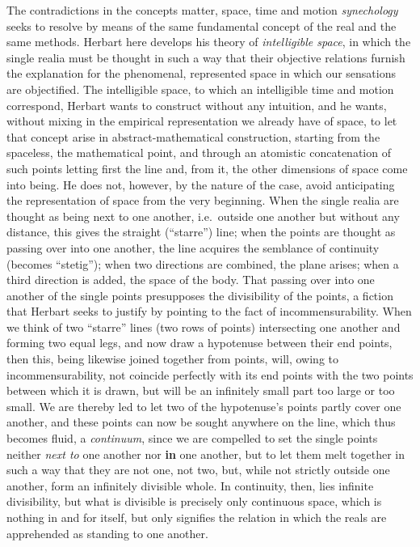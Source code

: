 The contradictions in the concepts matter, space, time and motion
\emph{synechology} seeks to resolve by means of the same fundamental
concept of the real and the same methods. Herbart here develops his
theory of \emph{intelligible space}, in which the single realia must be
thought in such a way that their objective relations furnish the
explanation for the phenomenal, represented space in which our
sensations are objectified. The intelligible space, to which an
intelligible time and motion correspond, Herbart wants to construct
without any intuition, and he wants, without mixing in the empirical
representation we already have of space, to let that concept arise in
abstract-mathematical construction, starting from the spaceless, the
mathematical point, and through an atomistic concatenation of such points
letting first the line and, from it, the other dimensions of space come
into being. He does not, however, by the nature of the case, avoid
anticipating the representation of space from the very beginning. When
the single realia are thought as being next to one another, i.e.\
outside one another but without any distance, this gives the straight
(``starre'') line; when the points are thought as passing over into one
another, the line acquires the semblance of continuity (becomes
``stetig''); when two directions are combined, the plane arises; when a
third direction is added, the space of the body. That passing over into
one another of the single points presupposes the divisibility of the
points, a fiction that Herbart seeks to justify by pointing to the fact
of incommensurability. When we think of two ``starre'' lines (two rows of
points) intersecting one another and forming two equal legs, and now draw
a hypotenuse between their end points, then this, being likewise joined
together from points, will, owing to incommensurability, not coincide
perfectly with its end points with the two points between which it is
drawn, but will be an infinitely small part too large or too small. We
are thereby led to let two of the hypotenuse's points partly cover one
another, and these points can now be sought anywhere on the line, which
thus becomes fluid, a \emph{continuum}, since we are compelled to set the
single points neither \emph{next to} one another nor \textbf{in} one
another, but to let them melt together in such a way that they are not
one, not two, but, while not strictly outside one another, form an
infinitely divisible whole. In continuity, then, lies infinite
divisibility, but what is divisible is precisely only continuous space,
which is nothing in and for itself, but only
signifies the relation in which the reals are apprehended as
standing to one another.

